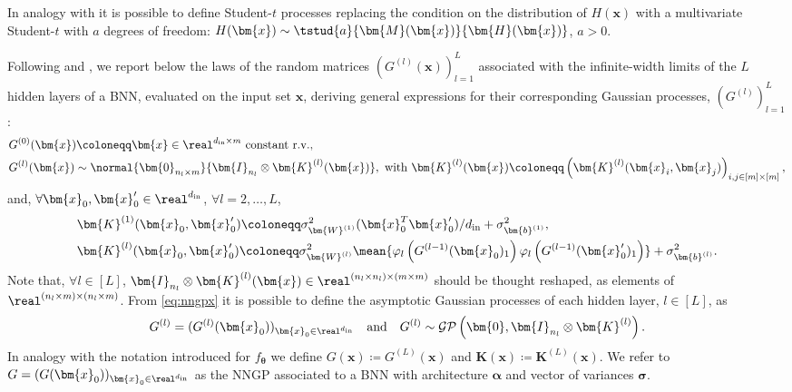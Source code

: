 \begin{remark}
    In analogy with  it is possible to define Student-$t$ processes replacing the condition on the distribution of $H(\bm{x})$ with a multivariate Student-$t$ with $a$ degrees of freedom: $H(\bm{x}) \sim \tstud{a}{\bm{M}(\bm{x})}{\bm{H}(\bm{x})}$, $a > 0$.
\end{remark}

Following \citet{matthews2018} and \citet{lee2018}, we report below the laws of the random matrices $(G^{(l)}(\bm{x}))_{l = 1}^L$ associated with the infinite-width limits of the $L$ hidden layers of a BNN, evaluated on the input set $\bm{x}$, deriving general expressions for their corresponding Gaussian processes, $(G^{(l)})_{l = 1}^L$:
\begin{equation} \label{eq:nngpx}	
    \begin{aligned}
        & G^{(0)}(\bm{x}) \coloneqq \bm{x} \in \real^{d_{\mathrm{in}} \times m} \text{ constant r.v.}, \\
        & G^{(l)}(\bm{x}) \sim \normal{\bm{0}_{n_l \times m}}{\bm{I}_{n_l} \otimes \bm{K}^{(l)}(\bm{x})}, \text{ with } \bm{K}^{(l)}(\bm{x}) \coloneqq \left(\bm{K}^{(l)}(\bm{x}_i, \bm{x}_j)\right)_{i, j \in [m] \times [m]},
    \end{aligned}
\end{equation}
and, $\forall \bm{x}_0, \bm{x}'_0 \in \real^{d_{\mathrm{in}}}$, $\forall l = 2, \dots, L$, 
\begin{equation*}
    \begin{aligned}
        & \bm{K}^{(1)}(\bm{x}_0, \bm{x}'_0) \coloneqq \sigma_{\bm{W}^{(1)}}^2 (\bm{x}_0^T \bm{x}'_0) / d_{\mathrm{in}} + \sigma_{\bm{b}^{(1)}}^2, \\ 
        & \bm{K}^{(l)}(\bm{x}_0, \bm{x}'_0) \coloneqq \sigma_{\bm{W}^{(l)}}^2 \mean{\varphi_{l}\left(G^{(l - 1)}(\bm{x}_0)_1\right) \varphi_{l}\left(G^{(l - 1)}(\bm{x}'_0)_1\right)} + \sigma_{\bm{b}^{(l)}}^2.
    \end{aligned}
\end{equation*}
Note that, $\forall l \in [L]$, $\bm{I}_{n_l} \otimes \bm{K}^{(l)}(\bm{x}) \in \real^{(n_l \times n_l) \times (m \times m)}$ should be thought reshaped, as elements of $\real^{(n_l \times m) \times (n_l \times m)}$. From \cref{eq:nngpx} it is possible to define the asymptotic Gaussian processes of each hidden layer, $l \in [L]$, as
\begin{equation} \label{eq:nngp}
    G^{(l)} = (G^{(l)}(\bm{x}_0))_{\bm{x}_0 \in \real^{d_{\mathrm{in}}}} \quad \text{and} \quad G^{(l)} \sim \mathcal{GP}\left(\bm{0}, \bm{I}_{n_l} \otimes \bm{K}^{(l)}\right).
\end{equation}
In analogy with the notation introduced for $f_{\bm{\theta}}$ we define $G(\bm{x}) \coloneqq G^{(L)}(\bm{x})$ and $\bm{K}(\bm{x}) \coloneqq \bm{K}^{(L)}(\bm{x})$. We refer to $G = (G(\bm{x}_0))_{\bm{x}_0 \in \real^{d_{\mathrm{in}}}}$ as the NNGP associated to a BNN with architecture $\bm{\alpha}$ and vector of variances $\bm{\sigma}$.

